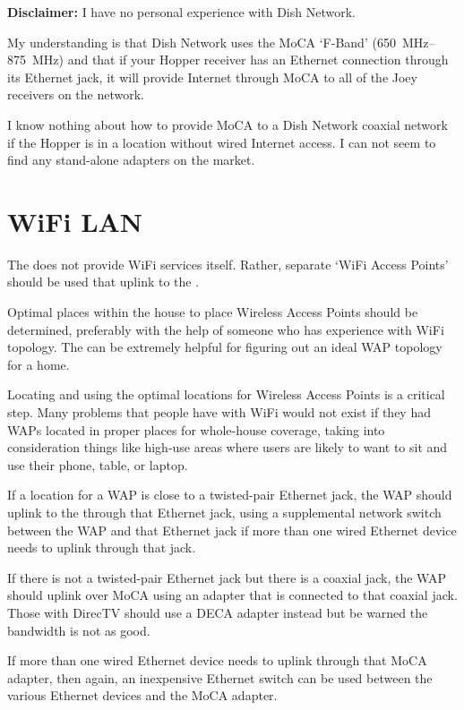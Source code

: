 \textbf{Disclaimer:} I have no personal experience with Dish Network.

My understanding is that Dish Network uses the MoCA `F-Band' (\qtyrange{650}{875}{\mega\hertz}) and that if your Hopper
receiver has an Ethernet connection through its Ethernet jack, it will provide Internet through MoCA to all of
the Joey receivers on the network.

I know nothing about how to provide MoCA to a Dish Network coaxial network if the Hopper is in a location without
wired Internet access. I can not seem to find any stand-alone \fband{} adapters on the market.



\section{WiFi LAN}
\label{apx:router:wifi}

The  does not provide WiFi services itself. Rather, separate `WiFi Access Points'
should be used that uplink to the .

Optimal places within the house to place Wireless Access Points should be determined, preferably with the
help of someone who has experience with WiFi topology. The
 can be extremely helpful for
figuring out an ideal WAP topology for a home.

Locating and using the optimal locations for Wireless Access Points is a critical step. Many problems that
people have with WiFi would not exist if they had WAPs located in proper places for whole-house coverage,
taking into consideration things like high-use areas where users are likely to want to sit and use their
phone, table, or laptop.

If a location for a WAP is close to a twisted-pair Ethernet jack, the WAP should uplink to the
 through that Ethernet jack, using a supplemental network switch between
the WAP and that Ethernet jack if more than one wired Ethernet device needs to uplink through that jack.

If there is not a twisted-pair Ethernet jack but there is a coaxial jack, the WAP should uplink over MoCA
using an \xdband{} adapter that is connected to that coaxial jack. Those with DirecTV should use a DECA
\eband{} adapter instead but be warned the bandwidth is not as good.

If more than one wired Ethernet device needs to uplink through that MoCA adapter, then again, an inexpensive
Ethernet switch can be used between the various Ethernet devices and the MoCA adapter.

